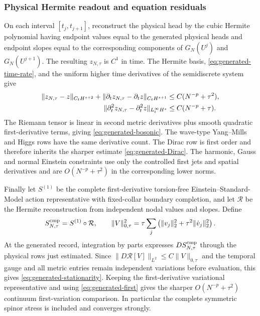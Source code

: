 \documentclass[11pt]{article}
\numberwithin{equation}{section}
\theoremstyle{definition}
\theoremstyle{remark}
\newcommand{\norm}[1]{\lVert#1\rVert}
\begin{document}
\subsubsection{Physical Hermite readout and equation residuals}

On each interval $[t_j,t_{j+1}]$, reconstruct the physical head by the cubic Hermite polynomial having endpoint values equal to the generated physical heads and endpoint slopes equal to the corresponding components of $G_N(U^j)$ and $G_N(U^{j+1})$.  The resulting $z_{N,\tau}$ is $C^1$ in time.  The Hermite basis, \eqref{eq:generated-time-rate}, and the uniform higher time derivatives of the semidiscrete system give
\begin{align}
 \norm{z_{N,\tau}-z}_{C_tH^{s+2}}
 +\norm{\partial_tz_{N,\tau}-\partial_tz}_{C_tH^{s+1}}
 &\le C(N^{-p}+\tau^2),\notag\\
 \norm{\partial_t^2z_{N,\tau}-\partial_t^2z}_{L^\infty_tH^s}
 &\le C(N^{-p}+\tau).
 \label{eq:generated-Hermite}
\end{align}
The Riemann tensor is linear in second metric derivatives plus smooth quadratic first-derivative terms, giving \eqref{eq:generated-bosonic}.  The wave-type Yang--Mills and Higgs rows have the same derivative count.  The Dirac row is first order and therefore inherits the sharper estimate \eqref{eq:generated-Dirac}.  The harmonic, Gauss and normal Einstein constraints use only the controlled first jets and spatial derivatives and are $O(N^{-p}+\tau^2)$ in the corresponding lower norms.

Finally let $S^{(1)}$ be the complete first-derivative torsion-free Einstein--Standard-Model action representative with fixed-collar boundary completion, and let $\mathcal R$ be the Hermite reconstruction from independent nodal values and slopes.  Define
\begin{equation}
 S^{\rm cmp}_{N,\tau}=S^{(1)}\circ\mathcal R,
 \qquad
 \norm V_{0,\tau}^2=\tau\sum_j
   \left(\norm{v_j}_2^2+\tau^2\norm{\dot v_j}_2^2\right).
 \label{eq:generated-comparison-action}
\end{equation}
At the generated record, integration by parts expresses $D S^{\rm cmp}_{N,\tau}$ through the physical rows just estimated.  Since $\norm{D\mathcal R[V]}_{L^2}\le C\norm V_{0,\tau}$ and the temporal gauge and all metric entries remain independent variations before evaluation, this gives \eqref{eq:generated-stationarity}.  Keeping the first-derivative variational representative and using \eqref{eq:generated-first} gives the sharper $O(N^{-p}+\tau^2)$ continuum first-variation comparison.  In particular the complete symmetric spinor stress is included and converges strongly.
\end{document}

